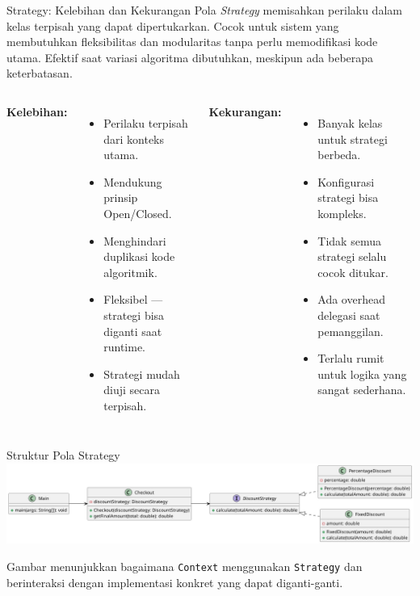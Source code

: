 \documentclass[aspectratio=169, table]{beamer}
\begin{document}
\begin{frame}{Strategy: Kelebihan dan Kekurangan}
	\vspace{10pt}
Pola \textit{Strategy} memisahkan perilaku dalam kelas terpisah yang dapat dipertukarkan. Cocok untuk sistem yang membutuhkan fleksibilitas dan modularitas tanpa perlu memodifikasi kode utama. Efektif saat variasi algoritma dibutuhkan, meskipun ada beberapa keterbatasan.
	
	
	\vspace{1pt}
	\begin{columns}[T]
		\textbf{Kelebihan:}
		\begin{itemize}
			\item Perilaku terpisah dari konteks utama.
			\item Mendukung prinsip Open/Closed.
			\item Menghindari duplikasi kode algoritmik.
			\item Fleksibel — strategi bisa diganti saat runtime.
			\item Strategi mudah diuji secara terpisah.
		\end{itemize}
		
		\textbf{Kekurangan:}
		\begin{itemize}
			\item Banyak kelas untuk strategi berbeda.
			\item Konfigurasi strategi bisa kompleks.
			\item Tidak semua strategi selalu cocok ditukar.
			\item Ada overhead delegasi saat pemanggilan.
			\item Terlalu rumit untuk logika yang sangat sederhana.
		\end{itemize}
	\end{columns}
	

\end{frame}

\begin{frame}{Struktur Pola Strategy}
	\vspace{10pt}
	\centering
	\includegraphics[width=\textwidth]{../../figures/out/strategy.png}
	\vspace{5pt}
	
	\small Gambar menunjukkan bagaimana \texttt{Context} menggunakan \texttt{Strategy} dan berinteraksi dengan implementasi konkret yang dapat diganti-ganti.
\end{frame}
\end{document}
